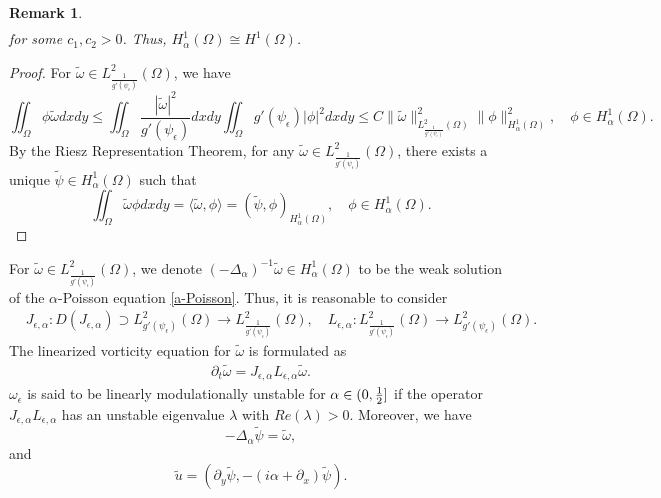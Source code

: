 \documentclass[1 [leqno, 11pt]{amsart}
\numberwithin{equation}{section}
\let\ep=\epsilon
\newtheorem{remark}[Theorem]{Remark}
\begin{document}
\begin{CJK*}{GBK}{song}
\begin{remark}
\begin{align*}
\end{align*}
 for some $c_1, c_2>0$. Thus,  $H^1_\alpha(\Omega)\cong H^1(\Omega)$.
\end{remark}
\begin{proof}
 For $\widetilde{\omega} \in L^2_{\frac{1}{g'(\psi_\ep)}}(\Omega)$, we have
$$\iint_\Omega \phi \widetilde{\omega} dxdy \leq \iint_\Omega  \frac{|\widetilde{\omega}|^2}{g'(\psi_\ep)} dxdy \iint_\Omega g'(\psi_\ep) |\phi|^2 dxdy \leq C \|\widetilde{\omega}\|^2_{L^2_{\frac{1}{g'(\psi_\ep)}}(\Omega)} \|\phi\|^2_{H_\alpha^1(\Omega)}, \quad \phi \in H_\alpha^1(\Omega). $$
By the Riesz Representation Theorem, for any $\widetilde{\omega} \in L^2_{\frac{1}{g'(\psi_\ep)}}(\Omega)$, there exists a unique $\widetilde{\psi} \in H_\alpha^1(\Omega)$ such that
$$\iint_\Omega \widetilde{\omega} \phi dxdy = \langle \widetilde{\omega}, \phi \rangle = (\widetilde{\psi}, \phi)_{H_\alpha^1(\Omega)},\quad \phi \in H_\alpha^1(\Omega).$$
\end{proof}
For $\widetilde{\omega} \in L^2_{\frac{1}{g'(\psi_\ep)}}(\Omega)$, we denote $(- \Delta_\alpha)^{-1} \widetilde{\omega} \in H_\alpha^1(\Omega)$ to be the weak solution of the $\alpha$-Poisson equation
\eqref{a-Poisson}.
Thus, it is reasonable to consider
\begin{align*}
 &J_{\epsilon, \alpha} : D(J_{\epsilon, \alpha})\supset L^2_{g'(\psi_\ep)}(\Omega)\to L^2_{\frac{1}{g'(\psi_\ep)}}(\Omega),\quad
   L_{\epsilon, \alpha} :L^2_{\frac{1}{g'(\psi_\ep)}}(\Omega)\to L^2_{g'(\psi_\ep)}(\Omega).
 \end{align*}
 \fi
The linearized vorticity equation for $\widetilde{\omega}$ is  formulated as
 \begin{align}\label{complex Ham-modu}
 \partial_t \widetilde{\omega} = J_{\ep, \alpha} L_{\ep, \alpha} \widetilde{\omega}.
 \end{align}
$\omega_\ep$ is said to be linearly modulationally unstable for $\alpha\in(0,{1\over 2}]$ if the operator $J_{\ep, \alpha} L_{\ep, \alpha}$
has an unstable eigenvalue $\lambda$ with $Re(\lambda)>0$.
 Moreover, we have
 \begin{equation}
 -\Delta_\alpha \widetilde{\psi} = \widetilde{\omega},
 \end{equation}
 and
 \begin{equation}
 \widetilde{u} =  (\partial_y \widetilde{\psi}, -(i\alpha+\partial_x) \widetilde{\psi}).
 \end{equation}
\fi



\end{CJK*}
\end{document}
